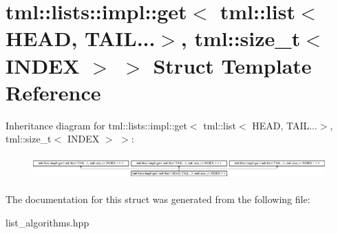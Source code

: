 \hypertarget{structtml_1_1lists_1_1impl_1_1get_3_01tml_1_1list_3_01HEAD_00_01TAIL_8_8_8_4_00_01tml_1_1size__t_3_01INDEX_01_4_01_4}{\section{tml\+:\+:lists\+:\+:impl\+:\+:get$<$ tml\+:\+:list$<$ H\+E\+A\+D, T\+A\+I\+L...$>$, tml\+:\+:size\+\_\+t$<$ I\+N\+D\+E\+X $>$ $>$ Struct Template Reference}
\label{structtml_1_1lists_1_1impl_1_1get_3_01tml_1_1list_3_01HEAD_00_01TAIL_8_8_8_4_00_01tml_1_1size__t_3_01INDEX_01_4_01_4}
}
Inheritance diagram for tml\+:\+:lists\+:\+:impl\+:\+:get$<$ tml\+:\+:list$<$ H\+E\+A\+D, T\+A\+I\+L...$>$, tml\+:\+:size\+\_\+t$<$ I\+N\+D\+E\+X $>$ $>$\+:\begin{figure}[H]
\begin{center}
\leavevmode
\includegraphics[height=0.938023cm]{structtml_1_1lists_1_1impl_1_1get_3_01tml_1_1list_3_01HEAD_00_01TAIL_8_8_8_4_00_01tml_1_1size__t_3_01INDEX_01_4_01_4}
\end{center}
\end{figure}


The documentation for this struct was generated from the following file\+:\begin{DoxyCompactItemize}
\item 
list\+\_\+algorithms.\+hpp\end{DoxyCompactItemize}
